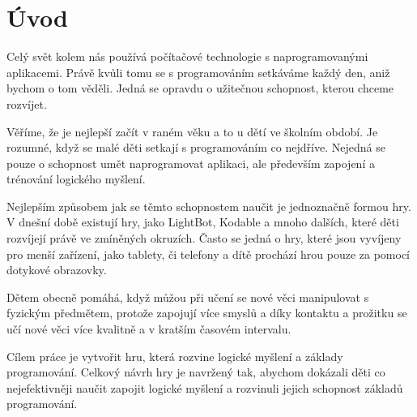 \chapter{Úvod}

Celý svět kolem nás používá počítačové technologie s naprogramovanými aplikacemi. Právě kvůli tomu se s programováním setkáváme každý den, aniž bychom o tom věděli. Jedná se opravdu o užitečnou schopnost, kterou chceme rozvíjet.\par
Věříme, že je nejlepší začít v raném věku a to u dětí ve školním období. Je rozumné, když se malé děti setkají s programováním co nejdříve. Nejedná se pouze o schopnost umět naprogramovat aplikaci, ale především zapojení a trénování logického myšlení.\par
Nejlepším způsobem jak se těmto schopnostem naučit je jednoznačně formou hry. V dnešní době existují hry, jako LightBot, Kodable a mnoho dalších, které děti rozvíjejí právě ve zmíněných okruzích. Často se jedná o hry, které jsou vyvíjeny pro menší zařízení, jako tablety, či telefony a dítě prochází hrou pouze za pomocí dotykové obrazovky.\par
Dětem obecně pomáhá, když můžou při učení se nové věci manipulovat s fyzickým předmětem, protože zapojují více smyslů a díky kontaktu a prožitku se učí nové věci více kvalitně a v kratším časovém intervalu.\par
Cílem práce je vytvořit hru, která rozvine logické myšlení a základy programování. Celkový návrh hry je navržený tak, abychom dokázali děti co nejefektivněji naučit zapojit logické myšlení a rozvinuli jejich schopnost základů programování.